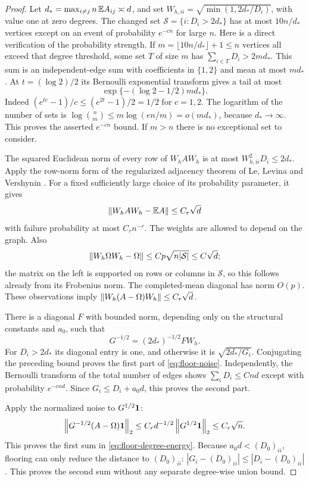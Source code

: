 \begin{proof}
Let $d_*=\max_{i\ne j}n\,\mathbb E A_{ij}\asymp d$, and set
$W_{h,ii}=\sqrt{\min(1,2d_*/D_i)}$, with value one at zero degrees.
The changed set $\mathcal S=\{i:D_i>2d_*\}$ has at most $10n/d_*$
vertices except on an event of probability $e^{-cn}$ for large $n$.
Here is a direct verification of the probability strength. If
$m=\lfloor10n/d_*\rfloor+1\le n$ vertices all exceed that degree
threshold, some set $T$ of size $m$ has
$\sum_{i\in T}D_i>2md_*$. This sum is an independent-edge sum with
coefficients in $\{1,2\}$ and mean at most $md_*$. At
$t=(\log2)/2$ its Bernoulli exponential transform gives a tail at most
\[
 \exp\{-(\log2-1/2)md_*\}.
\]
Indeed $(e^{tc}-1)/c\le(e^{2t}-1)/2=1/2$ for $c=1,2$.
The logarithm of the number of sets is
$\log\binom nm\le m\log(en/m)=o(md_*)$, because $d_*\to\infty$.
This proves the asserted $e^{-cn}$ bound. If $m>n$ there is no
exceptional set to consider.

The squared Euclidean norm of every row of $W_hAW_h$ is at most
$W_{h,ii}^2D_i\le2d_*$. Apply the row-norm form of the regularized
adjacency theorem of Le, Levina and Vershynin
\cite[Theorem 2.1 and Remark 2.2]{llv2017}. For a fixed sufficiently
large choice of its probability parameter, it gives
\[
 \left\lVert W_hAW_h-\mathbb E A\right\rVert\le C_r\sqrt d
\]
with failure probability at most $C_rn^{-r}$. The weights are allowed
to depend on the graph. Also
\[
 \left\lVert W_h\Omega W_h-\Omega\right\rVert
 \le Cp\sqrt{n|\mathcal S|}\le C\sqrt d;
\]
the matrix on the left is supported on rows or columns in
$\mathcal S$, so this follows already from its Frobenius norm.
The completed-mean diagonal has norm $O(p)$. These observations imply
$\left\lVert W_h(A-\Omega)W_h\right\rVert\le C_r\sqrt d$.

There is a diagonal $F$ with bounded norm, depending only on the
structural constants and $a_0$, such that
\[
 G^{-1/2}=(2d_*)^{-1/2}FW_h.
\]
For $D_i>2d_*$ its diagonal entry is one, and otherwise it is
$\sqrt{2d_*/G_i}$. Conjugating the preceding bound proves the first
part of \eqref{eq:floor-noise}. Independently, the Bernoulli transform
of the total number of edges shows
$\sum_iD_i\le Cnd$ except with probability $e^{-cnd}$.
Since $G_i\le D_i+a_0d$, this proves the second part.

Apply the normalized noise to $G^{1/2}\mathbf 1$:
\[
 \left\lVert G^{-1/2}(A-\Omega)\mathbf 1\right\rVert_2
 \le C_rd^{-1/2}\left\lVert G^{1/2}\mathbf 1\right\rVert_2\le C_r\sqrt n.
\]
This proves the first sum in \eqref{eq:floor-degree-energy}.
Because $a_0d<(D_0)_{ii}$, flooring can only reduce the distance to
$(D_0)_{ii}$:
$|G_i-(D_0)_{ii}|\le|D_i-(D_0)_{ii}|$.
This proves the second sum without any separate degree-wise union bound.


\end{proof}
